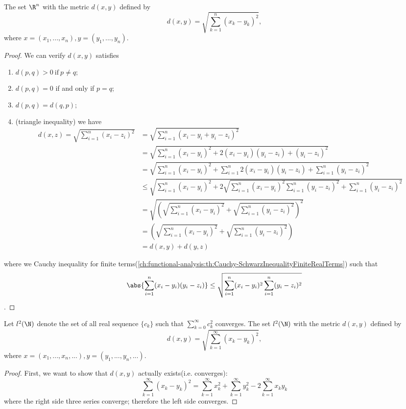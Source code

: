 \begin{refsection}
\begin{lemma}\label{ch:metric-space:th:RnMetricSpaceWithEnclideanMetric}
The set $\R^n$ with the metric $d(x,y)$ defined by
$$d(x,y) = \sqrt{\sum_{k=1}^n(x_k - y_k)^2},$$
where $x=(x_1,...,x_n), y = (y_1,...,y_n)$.
\end{lemma}
\begin{proof}
We can verify $d(x,y)$ satisfies
\begin{enumerate}
	\item $d(p,q) > 0 ~\text{if}~ p \neq q;$
	\item  $d(p,q)=0$ if and only if $p=q$;
	\item $d(p,q) = d(q,p);$
	\item (triangle inequality) we have
	\begin{align*}
d(x,z) = \sqrt{\sum_{i=1}^n (x_i - z_i)^2} &= \sqrt{\sum_{i=1}^n (x_i - y_i + y_i- z_i)^2} \\	
&= \sqrt{\sum_{i=1}^n (x_i - y_i)^2 +2(x_i-y_i)(y_i-z_i) + (y_i- z_i)^2} \\
&= \sqrt{\sum_{i=1}^n (x_i - y_i)^2 +\sum_{i=1}^n2(x_i-y_i)(y_i-z_i) + \sum_{i=1}^n(y_i- z_i)^2} \\
&\leq \sqrt{\sum_{i=1}^n (x_i - y_i)^2 +2\sqrt{\sum_{i=1}^n (x_i-y_i)^2\sum_{i=1}^n(y_i-z_i)^2} + \sum_{i=1}^n(y_i- z_i)^2} \\
& = \sqrt{(\sqrt{\sum_{i=1}^n (x_i - y_i)^2}+\sqrt{\sum_{i=1}^n (y_i - z_i)^2})^2} \\
& = (\sqrt{\sum_{i=1}^n (x_i - y_i)^2}+\sqrt{\sum_{i=1}^n (y_i - z_i)^2}) \\
& = d(x,y) + d(y,z)
\end{align*}
\end{enumerate}
where we Cauchy inequality for finite terms(\autoref{ch:functional-analysis:th:Cauchy-SchwarzInequalityFiniteRealTerms}) such that
$$\abs{\sum_{i=1}^n(x_i-y_i)(y_i-z_i)}\leq \sqrt{\sum_{i=1}^n (x_i-y_i)^2\sum_{i=1}^n(y_i-z_i)^2}$$.	
\end{proof}


\begin{lemma}
	Let $l^2(\N)$ denote the set of all real sequence $\{c_k\}$ such that $\sum_{k=0}^\infty c_k^2$ converges.
	The set $l^2(\N)$ with the metric $d(x,y)$ defined by
	$$d(x,y) = \sqrt{\sum_{k=1}^\infty(x_k - y_k)^2},$$
	where $x=(x_1,...,x_n,...), y = (y_1,...,y_n,...)$.
\end{lemma}
\begin{proof}	
	First, we want to show that $d(x,y)$ actually exists(i.e. converges):
	$$\sum_{k=1}^\infty(x_k - y_k)^2 = \sum_{k=1}^\infty x_k^2 + \sum_{k=1}^\infty y_k^2 -2 \sum_{k=1}^\infty x_ky_k$$
	where the right side three series converge; therefore the left side converges.
	

\end{proof}
\end{refsection}
